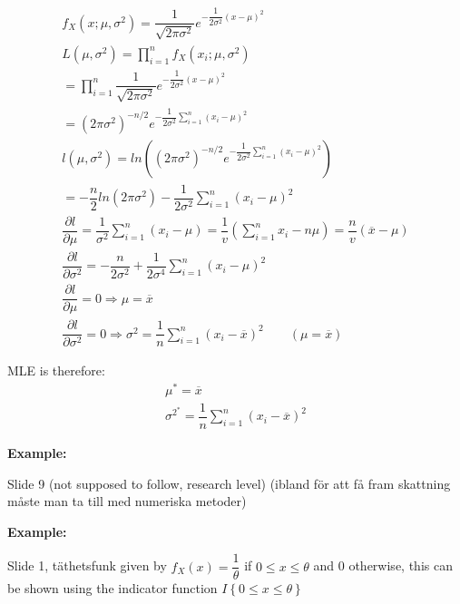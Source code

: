 \begin{equation*}
  \begin{gathered}
    f_X(x;\mu,\sigma^2) = \dfrac{1}{\sqrt{2\pi\sigma^2}}e^{-\dfrac{1}{2\sigma^2}(x-\mu)^2}\\
    L(\mu,\sigma^2) = \prod_{i=1}^n f_X(x_i;\mu,\sigma^2)\\
    = \prod_{i=1}^n\dfrac{1}{\sqrt{2\pi\sigma^2}}e^{-\dfrac{1}{2\sigma^2}(x-\mu)^2}\\
    = (2\pi\sigma^2)^{-n/2}e^{-\dfrac{1}{2\sigma^2}\sum_{i=1}^{n}(x_i-\mu)^2}\\
    l(\mu,\sigma^2) = ln\left((2\pi\sigma^2)^{-n/2}e^{-\dfrac{1}{2\sigma^2}\sum_{i=1}^{n}(x_i-\mu)^2}\right)\\
    = -\dfrac{n}{2}ln(2\pi\sigma^2)-\dfrac{1}{2\sigma^2}\sum_{i=1}^{n}(x_i-\mu)^2\\
    \dfrac{\partial l}{\partial \mu} = \dfrac{1}{\sigma^2}\sum_{i=1}^{n}(x_i-\mu) = \dfrac{1}{v}\left(\sum_{i=1}^{n}x_i-n\mu\right) = \dfrac{n}{v}\left(\overline{x}-\mu\right)\\
    \dfrac{\partial l}{\partial\sigma^2} = -\dfrac{n}{2\sigma^2} + \dfrac{1}{2\sigma^4}\sum_{i=1}^{n}(x_i-\mu)^2\\
    \dfrac{\partial l}{\partial \mu} = 0\Rightarrow \mu = \overline{x}\\
    \dfrac{\partial l}{\partial \sigma^2} = 0\Rightarrow \sigma^2 = \dfrac{1}{n}\sum_{i=1}^{n}(x_i-\overline{x})^2\qquad (\mu = \overline{x})
  \end{gathered}
\end{equation*}
\par\bigskip
\noindent MLE is therefore:
\begin{equation*}
  \begin{gathered}
    \mu^* = \overline{x}\\
    \sigma^{2^*} = \dfrac{1}{n}\sum_{i=1}^{n}(x_i-\overline{x})^2
  \end{gathered}
\end{equation*}
\par\bigskip
\noindent\textbf{Example:}\par
Slide 9 (not supposed to follow, research level) (ibland för att få fram skattning måste man ta till med numeriska metoder)
\par\bigskip
\noindent\textbf{Example:}\par
Slide 1, täthetsfunk given by $f_X(x) = \dfrac{1}{\theta}$ if $0\leq x\leq \theta$ and 0 otherwise, this can be shown using the indicator function $I\left\{0\leq x\leq \theta\right\}$
